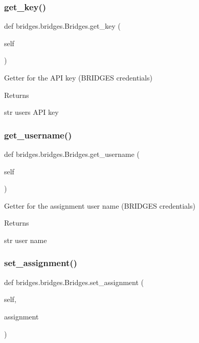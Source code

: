 \subsubsection{\texorpdfstring{get\+\_\+key()}{get\_key()}}
{\footnotesize\ttfamily def bridges.\+bridges.\+Bridges.\+get\+\_\+key (\begin{DoxyParamCaption}\item[{}]{self }\end{DoxyParamCaption})}



Getter for the A\+PI key (B\+R\+I\+D\+G\+ES credentials) 

\begin{DoxyReturn}{Returns}


str user\textquotesingle{}s A\+PI key 
\end{DoxyReturn}
\mbox{\label{classbridges_1_1bridges_1_1_bridges_abf6fdb19db336c2ed14987fdd89d65fe}} 
\subsubsection{\texorpdfstring{get\+\_\+username()}{get\_username()}}
{\footnotesize\ttfamily def bridges.\+bridges.\+Bridges.\+get\+\_\+username (\begin{DoxyParamCaption}\item[{}]{self }\end{DoxyParamCaption})}



Getter for the assignment user name (B\+R\+I\+D\+G\+ES credentials) 

\begin{DoxyReturn}{Returns}


str user name 
\end{DoxyReturn}
\mbox{\label{classbridges_1_1bridges_1_1_bridges_add46441bec1c93095c48adc724b90e12}} 
\subsubsection{\texorpdfstring{set\+\_\+assignment()}{set\_assignment()}}
{\footnotesize\ttfamily def bridges.\+bridges.\+Bridges.\+set\+\_\+assignment (\begin{DoxyParamCaption}\item[{}]{self,  }\item[{}]{assignment }\end{DoxyParamCaption})}



